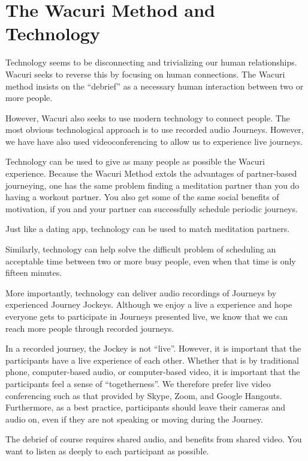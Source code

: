 \documentclass[12pt]{book}
\begin{document}
\chapter{The Wacuri Method and Technology}

Technology seems to be disconnecting and trivializing our human relationships.
Wacuri seeks to reverse this by focusing on human connections. The Wacuri method
insists on the ``debrief'' as a necessary human interaction between two or more people.

However, Wacuri also seeks to use modern technology to connect people.
The most obvious technological approach is to use recorded audio Journeys.
However, we have have also used videoconferencing to allow us to experience live journeys.

Technology can be used to give as many people as possible the Wacuri experience.
Because the Wacuri Method extols the advantages of partner-based journeying,
one has the same problem finding a meditation partner than you do having a
workout partner. You also get some of the same social benefits of motivation,
if you and your partner can successfully schedule periodic journeys.

Just like a dating app, technology can be used to match meditation partners.

Similarly, technology can help solve the difficult problem of scheduling an
acceptable time between two or more busy people, even when that time is only fifteen minutes.

More importantly, technology can deliver audio recordings of Journeys by
experienced Journey Jockeys. Although we enjoy a live a experience and hope
everyone gets to participate in Journeys presented live, we know that we
can reach more people through recorded journeys.

In a recorded journey, the Jockey is not ``live''. However, it is
important that the participants have a live experience of each other.
Whether that is by traditional phone, computer-based audio, or computer-based
video, it is important that the participants feel a sense of ``togetherness''.
We therefore prefer live video conferencing such as that provided by Skype,
Zoom, and Google Hangouts. Furthermore, as a best practice, participants
should leave their cameras and audio on, even if they are not speaking or
moving during the Journey.

The debrief of course requires shared audio, and benefits from shared video.
You want to listen as deeply to each participant as possible.
\end{document}
